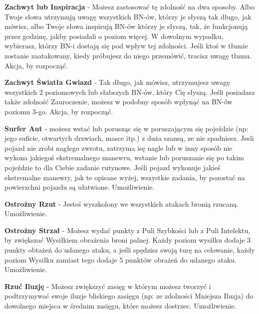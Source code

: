 {\textbf{Zachwyt lub Inspiracja}\label{sec:Zachwyt lub Inspiracja} - Możesz zastosować tę zdolność na dwa sposoby. Albo Twoje słowa utrzymują uwagę wszystkich BN-ów, którzy je słyszą tak długo, jak mówisz, albo Twoje słowa inspirują BN-ów którzy je słyszą, tak, że funkcjonują przez godzinę, jakby posiadali o poziom więcej. W dowolnym wypadku, wybierasz, którzy BN-i dostają się pod wpływ tej zdolności. Jeśli ktoś w tłumie zostanie zaatakowany, kiedy próbujesz do niego przemówić, tracisz uwagę tłumu. Akcja, by rozpocząć. 

\textbf{Zachwyt Światła Gwiazd}\label{sec:Zachwyt Światła Gwiazd} - Tak długo, jak mówisz, utrzymujesz uwagę wszystkich 2 poziomowych lub słabszych BN-ów, który Cię słyszą. Jeśli posiadasz także zdolność Zauroczenie, możesz w podobny sposób wpłynąć na BN-ów poziomu 3-go. Akcja, by rozpocząć.

\textbf{Surfer Aut}\label{sec:Surfer Aut} - możesz wstać lub porusząc się w poruszającym się pojeździe (np: jego suficie, otwartych drzwiach, masce itp.) z duża szansą, ze nie spadniesz. Jesli pojazd nie zrobi nagłego zwrotu, zatrzyma isę nagle lub w inny sposób nie wykona jakiegoś ekstremalnego manewru, wstanie lub poruszanie się po takim pojeździe to dla Ciebie zadanie rutynowe. Jeśli pojazd wykonuje jakieś ekstremalne manewry, jak te opisane wyżej, wszystkie zadania, by pozostać na powierzchni pojazdu są ułatwione. Umożliwienie. 

\textbf{Ostrożny Rzut}\label{sec:Ostrożny Rzut} - Jesteś wyszkolony we wszystkich atakach bronią rzucaną. Umożliwienie.

\textbf{Ostrożny Strzał}\label{sec:Ostrożny Strzał}  - Możesz wydać punkty z Puli Szybkości lub z Puli Intelektu, by zwiększać Wysiłkiem obrażenia broni palnej. Każdy poziom wysiłku dodaje 3 punkty obtażeń do udanego ataku, a jeśli spędzisz swoją turę na celowanie, każdy poziom Wysiłku zamiast tego dodaje 5 punktów obrażeń do udanego ataku. Umożliwienie.

\textbf{Rzuć Iluzję}\label{sec:Rzuć Iluzję} - Możesz zwiększyć zasięg w którym możesz tworzyć i podtrzymywać swoje iluzje bliskiego zasięgu (np: ze zdolności Mniejsza Iluzja) do dowolnego miejsca w średnim zasięgu, które możesz dostrzec. Umożliwienie. 

}
